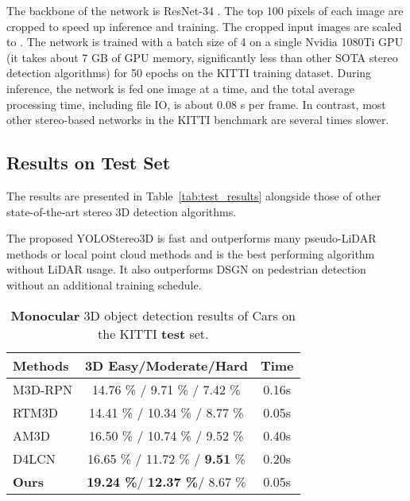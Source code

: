 \documentclass[letterpaper, 10 pt, conference]{ieeeconf}
\begin{document}
 The backbone of the network is ResNet-34 \cite{He2015Resnet}.
 The top 100 pixels of each image are cropped to speed up inference and training. The cropped input images are scaled to .
 The network is trained with a batch size of 4 on a single Nvidia 1080Ti GPU (it takes about 7 GB of GPU memory, significantly less than other SOTA stereo detection algorithms) for 50 epochs on the KITTI training dataset.
 During inference, the network is fed one image at a time, and the total average processing time, including file IO, is about 0.08 s per frame. In contrast, most other stereo-based networks in the KITTI benchmark are several times slower.

 \subsection{Results on Test Set}

 The results are presented in Table~\ref{tab:test_results} alongside those of other state-of-the-art stereo 3D detection algorithms.

 The proposed YOLOStereo3D is fast and outperforms many pseudo-LiDAR methods or local point cloud methods and is the best performing algorithm without LiDAR usage.
 It also outperforms DSGN \cite{Chen2020DSGN} on pedestrian detection without an additional training schedule.

 \begin{table}
    \centering
    \caption{\textbf{Monocular} 3D object detection results of Cars on the KITTI \textbf{test} set.}
    \begin{tabular*}{0.47\textwidth}{  | l|c|c| }
        \hline
        {\bf Methods} & {\bf  3D Easy/Moderate/Hard } & {\bf Time}\\ \hline
        M3D-RPN\cite{Brazil2019M3DRPN}      & 14.76 \% /       9.71 \%       / 7.42 \%  & 0.16s\\
        RTM3D\cite{Li2020RTM3DRM}           & 14.41 \% / 10.34 \% / 8.77 \%   & 0.05s\\
        AM3D\cite{Ma2019AM3D}               & 16.50 \% / 10.74 \% / 9.52 \%   & 0.40s\\
        D4LCN\cite{Ding2019D4LCN}           & 16.65 \% / 11.72 \% / \textbf{9.51} \% & 0.20s\\
        \hline
          \textbf{Ours}           & \textbf{19.24 \%}/  \textbf{12.37 \%}/   8.67 \%  & 0.05s\\
          \hline
  
    \end{tabular*} 
    \label{tab:test_mono}
  \end{table}
 
\end{document}
